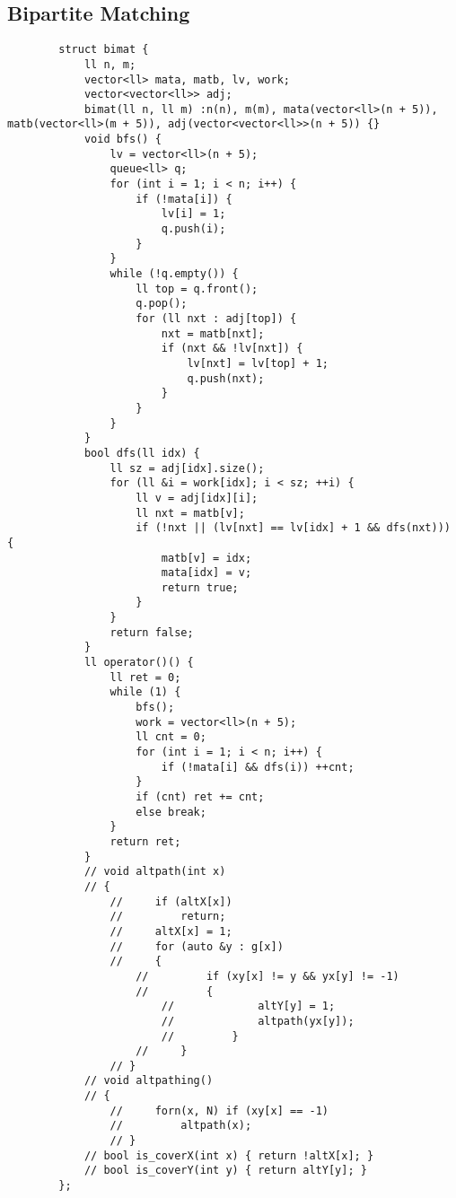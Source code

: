 \documentclass[landscape, 8pt, a4paper, oneside, twocolumn]{extarticle}
\begin{document}
	\subsection{Bipartite Matching}
	\begin{verbatim}
		struct bimat {
			ll n, m;
			vector<ll> mata, matb, lv, work;
			vector<vector<ll>> adj;
			bimat(ll n, ll m) :n(n), m(m), mata(vector<ll>(n + 5)), matb(vector<ll>(m + 5)), adj(vector<vector<ll>>(n + 5)) {}
			void bfs() {
				lv = vector<ll>(n + 5);
				queue<ll> q;
				for (int i = 1; i < n; i++) {
					if (!mata[i]) {
						lv[i] = 1;
						q.push(i);
					}
				}
				while (!q.empty()) {
					ll top = q.front();
					q.pop();
					for (ll nxt : adj[top]) {
						nxt = matb[nxt];
						if (nxt && !lv[nxt]) {
							lv[nxt] = lv[top] + 1;
							q.push(nxt);
						}
					}
				}
			}
			bool dfs(ll idx) {
				ll sz = adj[idx].size();
				for (ll &i = work[idx]; i < sz; ++i) {
					ll v = adj[idx][i];
					ll nxt = matb[v];
					if (!nxt || (lv[nxt] == lv[idx] + 1 && dfs(nxt))) {
						matb[v] = idx;
						mata[idx] = v;
						return true;
					}
				}
				return false;
			}
			ll operator()() {
				ll ret = 0;
				while (1) {
					bfs();
					work = vector<ll>(n + 5);
					ll cnt = 0;
					for (int i = 1; i < n; i++) {
						if (!mata[i] && dfs(i)) ++cnt;
					}
					if (cnt) ret += cnt;
					else break;
				}
				return ret;
			}
			// void altpath(int x)
			// {
				//     if (altX[x])
				//         return;
				//     altX[x] = 1;
				//     for (auto &y : g[x])
				//     {
					//         if (xy[x] != y && yx[y] != -1)
					//         {
						//             altY[y] = 1;
						//             altpath(yx[y]);
						//         }
					//     }
				// }
			// void altpathing()
			// {
				//     forn(x, N) if (xy[x] == -1)
				//         altpath(x);
				// }
			// bool is_coverX(int x) { return !altX[x]; }
			// bool is_coverY(int y) { return altY[y]; }
		};
	\end{verbatim}
\end{document}
